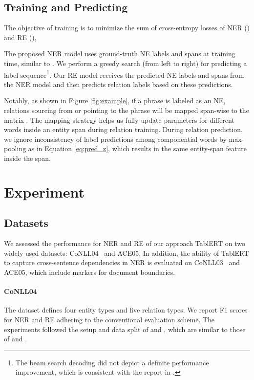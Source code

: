 \documentclass[11pt,a4paper]{article}
\begin{document}
\subsection{Training and Predicting}
\label{training}

The objective of training is to minimize the sum of cross-entropy losses of NER () and RE (),





The proposed NER model uses ground-truth NE labels and spans at training time, similar to \citet{zhang-etal-2017-end}. We perform a greedy search (from left to right) for predicting a label sequence\footnote{The beam search decoding did not depict a definite performance improvement, which is consistent with the report in \citet{miwa-bansal-2016-end}.}. Our RE model receives the predicted NE labels and spans from the NER model and then predicts relation labels based on these predictions. 

Notably, as shown in Figure \ref{fig:example}, if a phrase is labeled as an NE, relations sourcing from or pointing to the phrase will be mapped span-wise to the matrix . The mapping strategy helps us fully update parameters for different words inside an entity span during relation training. During relation prediction, we ignore inconsistency of label predictions among componential words by max-pooling as in Equation \ref{eq:pred_z}, which results in the same entity-span feature inside the span.

\section{Experiment}
\label{experiments}


\subsection{Datasets}
\label{dataset}



We assessed the performance for NER and RE of our approach TablERT on two widely used datasets: CoNLL04~\cite{roth-yih-2004-linear} and ACE05. In addition, the ability of TablERT to capture cross-sentence dependencies in NER is evaluated on CoNLL03~\cite{tjong-kim-sang-de-meulder-2003-introduction} and ACE05, which include markers for document boundaries.


\paragraph{CoNLL04}  The dataset defines four entity types and five relation types. We report F1 scores for NER and RE adhering to the conventional evaluation scheme. The experiments followed the setup and data split of \citet{gupta-etal-2016-table} and \citet{spert}, which are similar to those of \citet{miwa-sasaki-2014-modeling} and \citet{zhang-etal-2017-end}.
\end{document}
